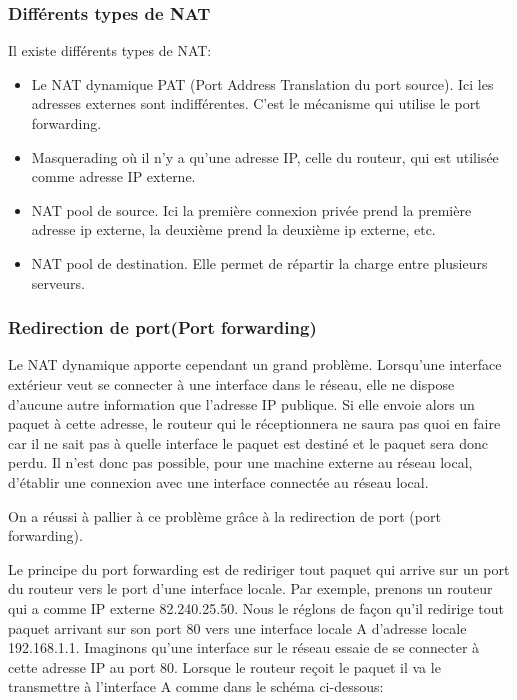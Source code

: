\subsubsection{Différents types de NAT}

Il existe différents types de NAT:
\begin{itemize}
\item Le NAT dynamique PAT (Port Address Translation du port source). Ici les
adresses externes sont indifférentes. C'est le mécanisme qui utilise le port forwarding.
\item Masquerading où il n'y a qu'une adresse IP, celle du routeur, qui est
utilisée comme adresse IP externe.
\item NAT pool de source. Ici la première connexion privée prend la première
adresse ip externe, la deuxième prend la deuxième ip externe, etc.
\item NAT pool de destination. Elle permet de répartir la charge entre plusieurs
serveurs.
\end{itemize}


\subsubsection{Redirection de port(Port forwarding)}

Le NAT dynamique apporte cependant un grand problème. Lorsqu'une interface
extérieur veut se connecter à une interface dans le réseau, elle ne dispose
d'aucune autre information que l'adresse IP publique. Si elle envoie alors un
paquet à cette adresse, le routeur qui le réceptionnera ne saura pas quoi en
faire car il ne sait pas à quelle interface le paquet est destiné et le paquet sera
donc perdu. Il n'est donc pas possible, pour une machine externe au réseau local, d'établir 
une connexion avec une interface connectée au réseau local.

On a réussi à pallier à ce problème grâce à la redirection de port (port 
forwarding). 

Le principe du port forwarding est de rediriger tout paquet qui arrive sur un
port du routeur vers le port d'une interface locale.
Par exemple, prenons un routeur qui a comme IP externe 82.240.25.50.
Nous le réglons de façon qu'il redirige tout paquet arrivant sur son port 80
vers une interface locale A d'adresse locale 192.168.1.1.
Imaginons qu'une interface sur le réseau essaie de se connecter à cette adresse
 IP au port 80.
Lorsque le routeur reçoit le paquet il va le transmettre à l'interface A comme
dans le schéma ci-dessous:

